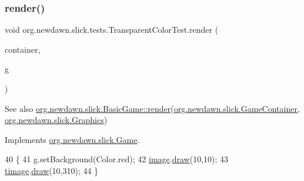 \subsubsection{\texorpdfstring{render()}{render()}}
{\footnotesize\ttfamily void org.\+newdawn.\+slick.\+tests.\+Transparent\+Color\+Test.\+render (\begin{DoxyParamCaption}\item[{\mbox{\hyperlink{classorg_1_1newdawn_1_1slick_1_1_game_container}{Game\+Container}}}]{container,  }\item[{\mbox{\hyperlink{classorg_1_1newdawn_1_1slick_1_1_graphics}{Graphics}}}]{g }\end{DoxyParamCaption})\hspace{0.3cm}{\ttfamily [inline]}}

\begin{DoxySeeAlso}{See also}
\mbox{\hyperlink{interfaceorg_1_1newdawn_1_1slick_1_1_game_af1a4670d43eb3ba04dfcf55ab1975b64}{org.\+newdawn.\+slick.\+Basic\+Game\+::render}}(\mbox{\hyperlink{classorg_1_1newdawn_1_1slick_1_1_game_container}{org.\+newdawn.\+slick.\+Game\+Container}}, \mbox{\hyperlink{classorg_1_1newdawn_1_1slick_1_1_graphics}{org.\+newdawn.\+slick.\+Graphics}}) 
\end{DoxySeeAlso}


Implements \mbox{\hyperlink{interfaceorg_1_1newdawn_1_1slick_1_1_game_af1a4670d43eb3ba04dfcf55ab1975b64}{org.\+newdawn.\+slick.\+Game}}.


\begin{DoxyCode}
40                                                             \{
41         g.setBackground(Color.red);
42         \mbox{\hyperlink{classorg_1_1newdawn_1_1slick_1_1tests_1_1_transparent_color_test_a4604f1b98ff0397381e1a18b3f50ec9d}{image}}.\mbox{\hyperlink{classorg_1_1newdawn_1_1slick_1_1_image_a9bddcca05c7140ab45df8ac5b250b6cd}{draw}}(10,10);
43         \mbox{\hyperlink{classorg_1_1newdawn_1_1slick_1_1tests_1_1_transparent_color_test_ac3344321755a8261d1a2eb28fb5816e0}{timage}}.\mbox{\hyperlink{classorg_1_1newdawn_1_1slick_1_1_image_a9bddcca05c7140ab45df8ac5b250b6cd}{draw}}(10,310);
44     \}
\end{DoxyCode}
\mbox{\label{classorg_1_1newdawn_1_1slick_1_1tests_1_1_transparent_color_test_a3b8d2635e574f5703f8fd46ec3a81944}} 

